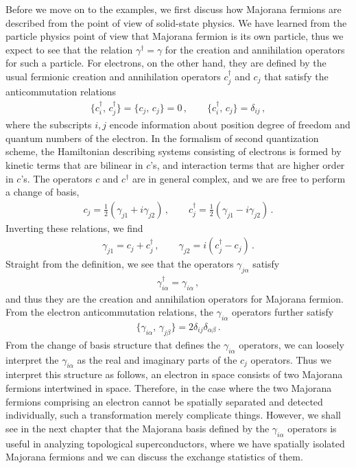 \documentclass[11pt, oneside]{book}
\theoremstyle{break}
\theoremstyle{break}
\begin{document}
Before we move on to the examples, we first discuss how Majorana fermions are described from the point of view of solid-state physics. We have learned from the particle physics point of view that Majorana fermion is its own particle, thus we expect to see that the relation $\gamma^\dagger = \gamma$ for the creation and annihilation operators for such a particle. For electrons, on the other hand, they are defined by the usual fermionic creation and annihilation operators $c_j^\dagger$ and $c_j$ that satisfy the anticommutation relations
\begin{align}
\{c_i^\dagger,\, c_j^\dagger\} = \{c_j,\, c_j\} = 0\,,\qquad
\{c_i^\dagger,\, c_j\} = \delta_{ij}\,,
\end{align}
where the subscripts $i,j$ encode information about position degree of freedom and quantum numbers of the electron. In the formalism of second quantization scheme, the Hamiltonian describing systems consisting of electrons is formed by kinetic terms that are bilinear in $c$'s, and interaction terms that are higher order in $c$'s. The operators $c$ and $c^\dagger$ are in general complex, and we are free to perform a change of basis, 
\begin{align}
c_j = \frac{1}{2}\left( \gamma_{j1}+i \gamma_{j2}\right) \,,\qquad
c^\dagger_j  = \frac{1}{2}\left( \gamma_{j1}-i\gamma_{j2}\right)\,.
\end{align}
Inverting these relations, we find
\begin{align}
\gamma_{j1} = c_j + c_j^\dagger \,,\qquad
\gamma_{j2} = i\left(c_j^\dagger-c_j\right)\,.
\end{align}
Straight from the definition, we see that the operators $\gamma_{j\alpha}$ satisfy 
\begin{align}
\gamma^\dagger_{i\alpha} = \gamma_{i\alpha}\,,
\end{align}
and thus they are the creation and annihilation operators for Majorana fermion. From the electron anticommutation relations, the $\gamma_{i\alpha}$ operators further satisfy
\begin{align}
\{\gamma_{i\alpha},\, \gamma_{j\beta}\} = 2\delta_{ij}\delta_{\alpha\beta}\,.
\end{align}
From the change of basis structure that defines the $\gamma_{i\alpha}$ operators, we can loosely interpret the $\gamma_{i\alpha}$ as the real and imaginary parts of the $c_j$ operators. Thus we interpret this structure as follows, an electron in space consists of two Majorana fermions intertwined in space. Therefore, in the case where the two Majorana fermions comprising an electron cannot be spatially separated and detected individually, such a transformation merely complicate things. However, we shall see in the next chapter that the Majorana basis defined by the $\gamma_{i\alpha}$ operators is useful in analyzing topological superconductors, where we have spatially isolated Majorana fermions and we can discuss the exchange statistics of them. 
\end{document}
